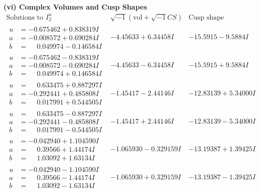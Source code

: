 \documentclass[1p]{elsarticle_modified}
\theoremstyle{definition}
\newcommand{\I}{\sqrt{-1}}
\begin{document}
\newpage\flushleft \textbf{(vi) Complex Volumes and Cusp Shapes}
$$\begin{array}{c|c|c}  
\text{Solutions to }I^u_{2}& \I (\text{vol} + \sqrt{-1}CS) & \text{Cusp shape}\\
 \hline 
\begin{aligned}
u &= -0.675462 + 0.838319 I \\
a &= -0.008572 + 0.690284 I \\
b &= \phantom{-}0.049974 - 0.146584 I\end{aligned}
 & -4.45633 + 6.34458 I & -15.5915 - 9.5884 I \\ \hline\begin{aligned}
u &= -0.675462 - 0.838319 I \\
a &= -0.008572 - 0.690284 I \\
b &= \phantom{-}0.049974 + 0.146584 I\end{aligned}
 & -4.45633 - 6.34458 I & -15.5915 + 9.5884 I \\ \hline\begin{aligned}
u &= \phantom{-}0.633475 + 0.887297 I \\
a &= -0.292441 + 0.485808 I \\
b &= \phantom{-}0.017991 + 0.544505 I\end{aligned}
 & -1.45417 - 2.44146 I & -12.83139 + 5.34000 I \\ \hline\begin{aligned}
u &= \phantom{-}0.633475 - 0.887297 I \\
a &= -0.292441 - 0.485808 I \\
b &= \phantom{-}0.017991 - 0.544505 I\end{aligned}
 & -1.45417 + 2.44146 I & -12.83139 - 5.34000 I \\ \hline\begin{aligned}
u &= -0.042940 + 1.104590 I \\
a &= \phantom{-}0.39566 + 1.44174 I \\
b &= \phantom{-}1.03092 + 1.63134 I\end{aligned}
 & -1.065930 - 0.329159 I & -13.19387 + 1.39425 I \\ \hline\begin{aligned}
u &= -0.042940 - 1.104590 I \\
a &= \phantom{-}0.39566 - 1.44174 I \\
b &= \phantom{-}1.03092 - 1.63134 I\end{aligned}
 & -1.065930 + 0.329159 I & -13.19387 - 1.39425 I \\ \hline\begin{aligned}

\end{aligned}
\end{array}$$
\end{document}
